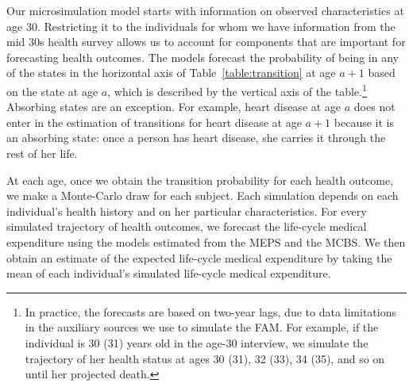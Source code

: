 Our microsimulation model starts with information on observed characteristics at age 30. Restricting it to the individuals for whom we have information from the mid 30s health survey allows us to account for components that are important for forecasting health outcomes. The models forecast the probability of being in any of the states in the horizontal axis of Table~\ref{table:transition} at age $a+1$ based on the state at age $a$, which is described by the vertical axis of the table.\footnote{In practice, the forecasts are based on two-year lags, due to data limitations in the auxiliary sources we use to simulate the FAM. For example, if the individual is 30 (31) years old in the age-30 interview, we simulate the trajectory of her health status at ages 30 (31), 32 (33), 34 (35), and so on until her projected death.} Absorbing states are an exception. For example, heart disease at age $a$ does not enter in the estimation of transitions for heart disease at age $a+1$ because it is an absorbing state: once a person has heart disease, she carries it through the rest of her life.

At each age, once we obtain the transition probability for each health outcome, we make a Monte-Carlo draw for each subject. Each simulation depends on each individual's health history and on her particular characteristics. For every simulated trajectory of health outcomes, we forecast the life-cycle medical expenditure using the models estimated from the MEPS and the MCBS. We then obtain an estimate of the expected life-cycle medical expenditure by taking the mean of each individual's simulated life-cycle medical expenditure.

